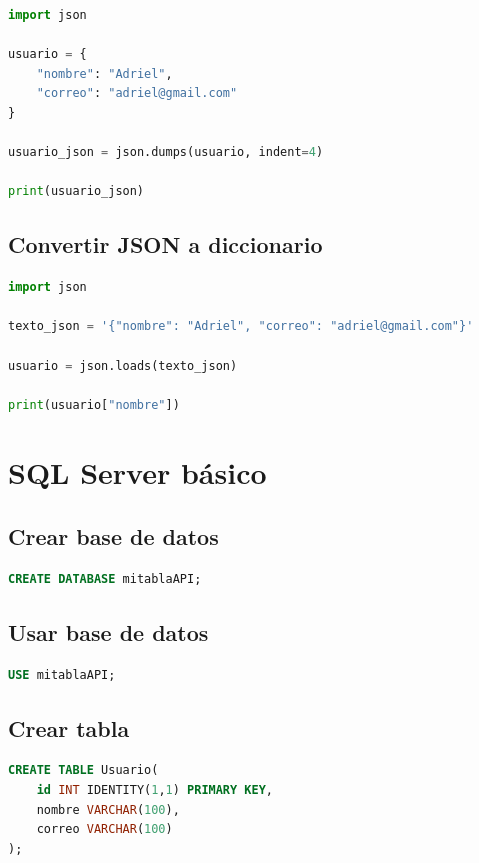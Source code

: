 \documentclass[12pt]{article}
\begin{document}
\begin{lstlisting}[language=Python]
import json

usuario = {
    "nombre": "Adriel",
    "correo": "adriel@gmail.com"
}

usuario_json = json.dumps(usuario, indent=4)

print(usuario_json)
\end{lstlisting}

\subsection{Convertir JSON a diccionario}

\begin{lstlisting}[language=Python]
import json

texto_json = '{"nombre": "Adriel", "correo": "adriel@gmail.com"}'

usuario = json.loads(texto_json)

print(usuario["nombre"])
\end{lstlisting}

\section{SQL Server básico}

\subsection{Crear base de datos}

\begin{lstlisting}[language=SQL]
CREATE DATABASE mitablaAPI;
\end{lstlisting}

\subsection{Usar base de datos}

\begin{lstlisting}[language=SQL]
USE mitablaAPI;
\end{lstlisting}

\subsection{Crear tabla}

\begin{lstlisting}[language=SQL]
CREATE TABLE Usuario(
    id INT IDENTITY(1,1) PRIMARY KEY,
    nombre VARCHAR(100),
    correo VARCHAR(100)
);
\end{lstlisting}
\end{document}
